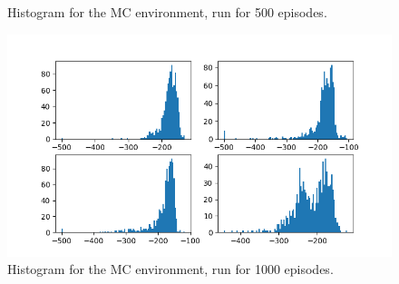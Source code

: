 \documentclass[hidelinks,journal]{IEEEtran}
\begin{document}
\begin{figure}[p]
  \caption{Histogram for the MC environment, run for 500 episodes.}
  \label{fig:mc3ResHist}
  \includegraphics[scale=0.45]{graph/mcEvalHist.png}
  \caption{Histogram for the MC environment, run for 1000 episodes.}
  \label{fig:mc4ResHist}
\end{figure}
\end{document}
